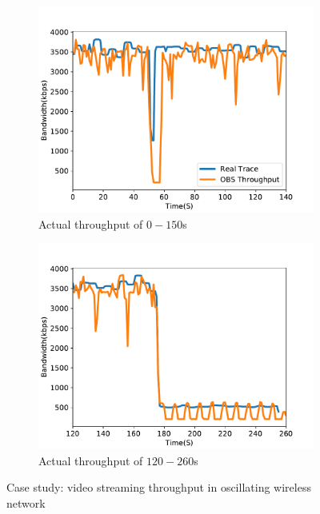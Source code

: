 \begin{figure}[htb]
\centering
\begin{subfigure}[b]{.45\columnwidth}
\centering
\includegraphics[width=\textwidth]{fig/case_study_throughput_a.pdf}
\caption{Actual throughput of $0-150$s}
\label{fig:case-throughput-b} 
\end{subfigure}
\begin{subfigure}[b]{.45\columnwidth}
\centering
\includegraphics[width=\textwidth]{fig/case_study_throughput_b.pdf}
\caption{Actual throughput of $120-260$s}
\label{fig:case-throughput-a} 
\end{subfigure}
\caption{Case study: video streaming throughput in oscillating wireless network}
\label{fig:case-throughput} 
\end{figure} 